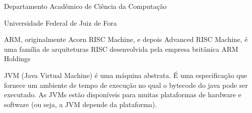\documentclass[
	12pt,				%
	openright,			%
	oneside,			%
	a4paper,			%
	english,			%
	french,				%
	spanish,			%
	brazil,				%
	]{abntex2}
\begin{document}
\begin{siglas}
     Departamento Acadêmico de Ciência da Computação
    
     Universidade Federal de Juiz de Fora
    
     ARM, originalmente Acorn RISC Machine, e depois Advanced RISC Machine, é uma família de arquiteturas RISC desenvolvida pela empresa britânica ARM Holdings
    
    
    
    
    
    
    
    
    
     JVM (Java Virtual Machine) é uma máquina abstrata. É uma especificação que fornece um ambiente de tempo de execução no qual o bytecode do java pode ser executado.
As JVMs estão disponíveis para muitas plataformas de hardware e software (ou seja, a JVM depende da plataforma).
    
    
    
    
    
    
    
\end{siglas}


\tableofcontents*

\textual
\setcounter{page}{1}
\end{document}
